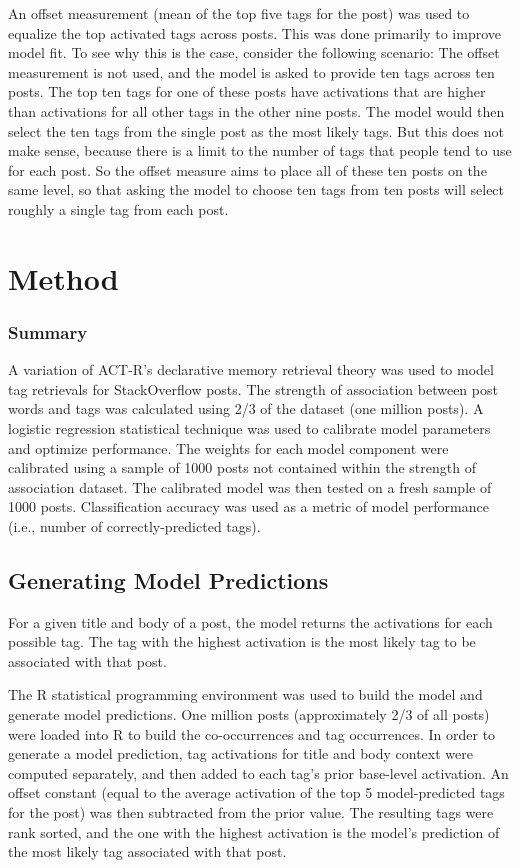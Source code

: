 \documentclass[10pt,letterpaper]{article}
\begin{document}
An offset measurement (mean of the top five tags for the post) was used to equalize the top activated tags across posts.
This was done primarily to improve model fit.
To see why this is the case, consider the following scenario:
The offset measurement is not used, and the model is asked to provide ten tags across ten posts.
The top ten tags for one of these posts have activations that are higher than activations for all other tags in the other nine posts.
The model would then select the ten tags from the single post as the most likely tags.
But this does not make sense, because there is a limit to the number of tags that people tend to use for each post.
So the offset measure aims to place all of these ten posts on the same level, so that asking the model to choose ten tags from ten posts will select roughly a single tag from each post.

\section{Method}

\subsubsection{Summary}

A variation of ACT-R's declarative memory retrieval theory \cite{Anderson2004} was used to model tag retrievals for StackOverflow posts.
The strength of association between post words and tags was calculated using 2/3 of the dataset (one million posts).
A logistic regression statistical technique was used to calibrate model parameters and optimize performance.
The weights for each model component were calibrated using a sample of \num{1000} posts not contained within the strength of association dataset.
The calibrated model was then tested on a fresh sample of \num{1000} posts.
Classification accuracy was used as a metric of model performance (i.e., number of correctly-predicted tags).

\subsection{Generating Model Predictions}

For a given title and body of a post, the model returns the activations for each possible tag.
The tag with the highest activation is the most likely tag to be associated with that post.

The R statistical programming environment was used to build the model and generate model predictions.
One million posts (approximately 2/3 of all posts) were loaded into R to build the co-occurrences and tag occurrences.
In order to generate a model prediction, tag activations for title and body context were computed separately, and then added to each tag's prior base-level activation.
An offset constant (equal to the average activation of the top 5 model-predicted tags for the post) was then subtracted from the prior value.
The resulting tags were rank sorted, and the one with the highest activation is the model's prediction of the most likely tag associated with that post.
\end{document}
